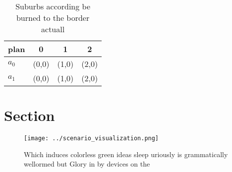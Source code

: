 \documentclass[a4paper]{article}
\begin{document}
\begin{table}
\begin{adjustbox}{width=0.6\columnwidth}
\begin{tabular}{|l|l|l|l|}
\hline
\textbf{plan} & \multicolumn{1}{c|}{\textbf{0}} & \multicolumn{1}{c|}{\textbf{1}} & \multicolumn{1}{c|}{\textbf{2}} \\ \hline
\textbf{$a_0$}  & (0,0) & (1,0) & (2,0) \\ \hline
\textbf{$a_1$}  & (0,0) & (1,0) & (2,0) \\ \hline
\end{tabular}
\end{adjustbox}
\caption{Suburbs according be burned to the border actuall
}
\end{table}

\section{Section}

\begin{figure}
\centering
\texttt{[image: ../scenario\_visualization.png]}
\caption{Which induces colorless green ideas sleep uriously is grammatically wellormed but Glory in by devices on the 
}
\end{figure}
 
\end{document}

